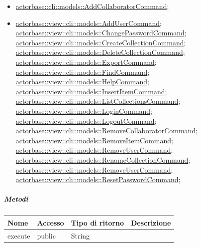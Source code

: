\documentclass{scalatekids-article}
\begin{document}
\begin{itemize}
	\item \hyperref[sec:actorbase::cli::models::AddCollaboratorCommand]{actorbase::cli::models::AddCollaboratorCommand};
	\item \hyperref[sec:actorbase::view::cli::models::AddUserCommand]{actorbase::view::cli::models::AddUserCommand};
	\hyperref[sec:actorbase::view::cli::models::ChangePasswordCommand]{actorbase::view::cli::models::ChangePasswordCommand};
	\hyperref[sec:actorbase::view::cli::models::CreateCollectionCommand]{actorbase::view::cli::models::CreateCollectionCommand};
	\hyperref[sec:actorbase::view::cli::models::DeleteCollectionCommand]{actorbase::view::cli::models::DeleteCollectionCommand};
	\hyperref[sec:actorbase::view::cli::models::ExportCommand]{actorbase::view::cli::models::ExportCommand};
	\hyperref[sec:actorbase::view::cli::models::FindCommand]{actorbase::view::cli::models::FindCommand};
	\hyperref[sec:actorbase::view::cli::models::HelpCommand]{actorbase::view::cli::models::HelpCommand};
	\hyperref[sec:actorbase::view::cli::models::InsertItemCommand]{actorbase::view::cli::models::InsertItemCommand};
	\hyperref[sec:actorbase::view::cli::models::ListCollectionsCommand]{actorbase::view::cli::models::ListCollectionsCommand};
	\hyperref[sec:actorbase::view::cli::models::LoginCommand]{actorbase::view::cli::models::LoginCommand};
	\hyperref[sec:actorbase::view::cli::models::LogoutCommand]{actorbase::view::cli::models::LogoutCommand};
	\hyperref[sec:actorbase::view::cli::models::RemoveCollaboratorCommand]{actorbase::view::cli::models::RemoveCollaboratorCommand};
	\hyperref[sec:actorbase::view::cli::models::RemoveItemCommand]{actorbase::view::cli::models::RemoveItemCommand};
	\hyperref[sec:actorbase::view::cli::models::RemoveUserCommand]{actorbase::view::cli::models::RemoveUserCommand};
	\hyperref[sec:actorbase::view::cli::models::RenameCollectionCommand]{actorbase::view::cli::models::RenameCollectionCommand};
	\hyperref[sec:actorbase::view::cli::models::RemoveUserCommand]{actorbase::view::cli::models::RemoveUserCommand};
	\hyperref[sec:actorbase::view::cli::models::ResetPasswordCommand]{actorbase::view::cli::models::ResetPasswordCommand};
\end{itemize}

\subparagraph{Metodi}

\begin{tabular}{| l | l | l | l |}
	\hline
	Nome & Accesso & Tipo di ritorno & Descrizione\\
	\hline
	execute & public & String & \\
	\hline
\end{tabular}
\end{document}
